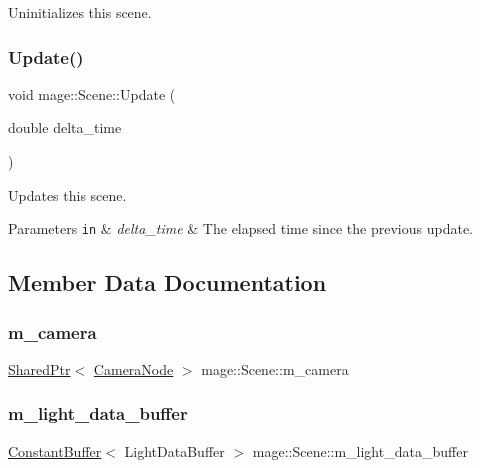 Uninitializes this scene. \hypertarget{classmage_1_1_scene_aa10e6eafc00834f63f146589326cbfe2}{}\label{classmage_1_1_scene_aa10e6eafc00834f63f146589326cbfe2} 
\subsubsection{\texorpdfstring{Update()}{Update()}}
{\footnotesize\ttfamily void mage\+::\+Scene\+::\+Update (\begin{DoxyParamCaption}\item[{double}]{delta\+\_\+time }\end{DoxyParamCaption})}

Updates this scene.


\begin{DoxyParams}[1]{Parameters}
\mbox{\tt in}  & {\em delta\+\_\+time} & The elapsed time since the previous update. \\
\hline
\end{DoxyParams}


\subsection{Member Data Documentation}
\hypertarget{classmage_1_1_scene_a39c785951d9fb99477c1894eabba0cc6}{}\label{classmage_1_1_scene_a39c785951d9fb99477c1894eabba0cc6} 
\subsubsection{\texorpdfstring{m\+\_\+camera}{m\_camera}}
{\footnotesize\ttfamily \hyperlink{namespacemage_a1e01ae66713838a7a67d30e44c67703e}{Shared\+Ptr}$<$ \hyperlink{classmage_1_1_camera_node}{Camera\+Node} $>$ mage\+::\+Scene\+::m\+\_\+camera\hspace{0.3cm}{\ttfamily [private]}}

\hypertarget{classmage_1_1_scene_aa74ca1637e0a88546135d64bf3614f29}{}\label{classmage_1_1_scene_aa74ca1637e0a88546135d64bf3614f29} 
\subsubsection{\texorpdfstring{m\+\_\+light\+\_\+data\+\_\+buffer}{m\_light\_data\_buffer}}
{\footnotesize\ttfamily \hyperlink{structmage_1_1_constant_buffer}{Constant\+Buffer}$<$ Light\+Data\+Buffer $>$ mage\+::\+Scene\+::m\+\_\+light\+\_\+data\+\_\+buffer\hspace{0.3cm}{\ttfamily [private]}}

